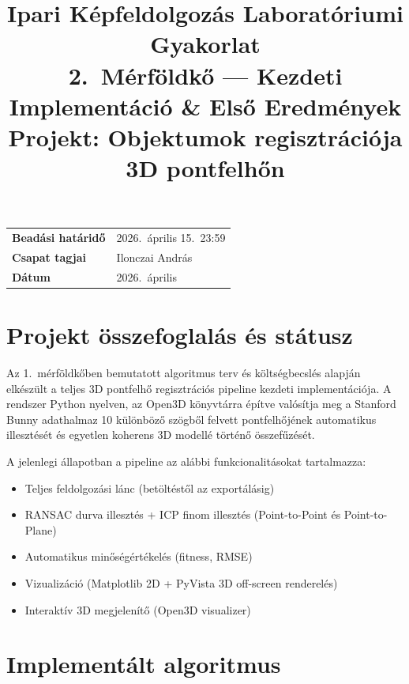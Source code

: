 \documentclass[12pt,a4paper]{article}
\title{
    \textbf{Ipari Képfeldolgozás Laboratóriumi Gyakorlat} \\[0.3cm]
    \Large 2.~Mérföldkő — Kezdeti Implementáció \& Első Eredmények \\[0.3cm]
    \large Projekt: Objektumok regisztrációja 3D pontfelhőn
}
\author{}
\date{}
\begin{document}
\maketitle
\thispagestyle{empty}

\vspace{-1.5cm}

\begin{table}[H]
\centering
\begin{tabular}{ll}
\toprule
\textbf{Beadási határidő} & 2026.~április 15.~23:59 \\
\textbf{Csapat tagjai}     & Ilonczai András \\
\textbf{Dátum}             & 2026.~április \\
\bottomrule
\end{tabular}
\end{table}

\section{Projekt összefoglalás és státusz}

Az 1.~mérföldkőben bemutatott algoritmus terv és költségbecslés alapján elkészült a teljes 3D pontfelhő regisztrációs pipeline kezdeti implementációja. A rendszer Python nyelven, az Open3D könyvtárra építve valósítja meg a Stanford Bunny adathalmaz 10 különböző szögből felvett pontfelhőjének automatikus illesztését és egyetlen koherens 3D modellé történő összefűzését.

A jelenlegi állapotban a pipeline az alábbi funkcionalitásokat tartalmazza:
\begin{itemize}[nosep]
    \item Teljes feldolgozási lánc (betöltéstől az exportálásig)
    \item RANSAC durva illesztés + ICP finom illesztés (Point-to-Point és Point-to-Plane)
    \item Automatikus minőségértékelés (fitness, RMSE)
    \item Vizualizáció (Matplotlib 2D + PyVista 3D off-screen renderelés)
    \item Interaktív 3D megjelenítő (Open3D visualizer)
\end{itemize}

\section{Implementált algoritmus}
\end{document}
